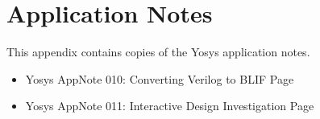 
\chapter{Application Notes}
\label{chapter:appnotes}

%

This appendix contains copies of the Yosys application notes.

\begin{itemize}
\item Yosys AppNote 010: Converting Verilog to BLIF \dotfill Page \pageref{app:010} \hskip2cm\null
\item Yosys AppNote 011: Interactive Design Investigation \dotfill Page \pageref{app:011} \hskip2cm\null
\end{itemize}

\eject\label{app:010}


\eject\label{app:011}


